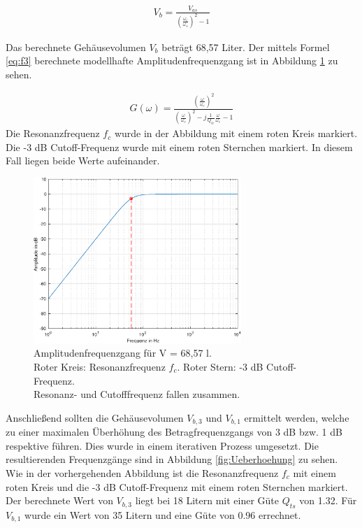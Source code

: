 \begin{align}
\label{eq:f2}
V_b = \frac{V_{as}} {\left( \frac{\omega_c}{\omega_s} \right) ^{2} - 1}
\end{align}

Das berechnete Gehäusevolumen  $V_b$ beträgt 68,57 Liter.
Der mittels Formel \ref{eq:f3} berechnete modellhafte Amplitudenfrequenzgang ist in Abbildung \ref{fig:Normaler_Frequenzgang} zu sehen.

\begin{align}
\label{eq:f3}
G(\omega) = \frac{(\frac{\omega}{\omega_c})^2}{(\frac{\omega}{\omega_c})^2 - j \frac{1}{Q_{tc}}\frac{\omega}{\omega_c}-1}
\end{align}
Die Resonanzfrequenz $f_c$ wurde in der Abbildung mit einem roten Kreis markiert. 
Die -3 dB Cutoff-Frequenz wurde mit einem roten Sternchen markiert.
In diesem Fall liegen beide Werte aufeinander.

\begin{figure}[H]
    \centering
    \includegraphics[width=0.7\textwidth]{Figures/Normaler_Frequenzgang.eps}
    \captionsetup{justification=centering}
    \caption{Amplitudenfrequenzgang für V = 68,57 l.\\
    Roter Kreis: Resonanzfrequenz $f_c$. Roter Stern: -3 dB Cutoff-Frequenz.\\
    Resonanz- und Cutofffrequenz fallen zusammen.}
    \label{fig:Normaler_Frequenzgang}
\end{figure}%

Anschließend sollten die Gehäusevolumen $V_{b,3}$ und $V_{b,1}$ ermittelt werden, welche zu einer maximalen Überhöhung des Betragfrequenzgangs von 3 dB bzw. 1 dB respektive führen.
Dies wurde in einem iterativen Prozess umgesetzt.
Die resultierenden Frequenzgänge sind in Abbildung \ref{fig:Ueberhoehung} zu sehen.
Wie in der vorhergehenden Abbildung ist die Resonanzfrequenz $f_c$ mit einem roten Kreis und die -3 dB Cutoff-Frequenz mit einem roten Sternchen markiert.
Der berechnete Wert von $V_{b,3}$ liegt bei 18 Litern mit einer Güte $Q_{ts}$ von 1.32.
Für $V_{b,1}$ wurde ein Wert von 35 Litern und eine Güte von 0.96 errechnet.

